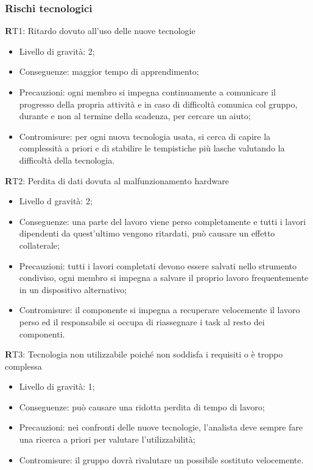 \subsubsection{Rischi tecnologici}
\textbf RT1:
 Ritardo dovuto all'uso delle nuove tecnologie
\begin{itemize}
\item Livello di gravità: 2;
\item Conseguenze: maggior tempo di apprendimento;
\item Precauzioni: ogni membro si impegna continuamente a comunicare il progresso della propria attività e in caso di difficoltà comunica col gruppo, durante e non al termine della scadenza, per cercare un aiuto;
\item Contromisure: per ogni nuova tecnologia usata, si cerca di capire la complessità a priori e di stabilire le tempistiche più lasche valutando la difficoltà della tecnologia.
\end{itemize}

\textbf RT2: 
Perdita di dati dovuta al malfunzionamento hardware
\begin{itemize}
\item Livello d gravità: 2;
\item Conseguenze: una parte del lavoro viene perso completamente e tutti i lavori dipendenti da quest'ultimo vengono ritardati, può causare un effetto collaterale;
\item Precauzioni: tutti i lavori completati devono essere salvati nello strumento condiviso, ogni membro si impegna a salvare il proprio lavoro frequentemente in un dispositivo alternativo;
\item Contromisure: il componente si impegna a recuperare velocemente il lavoro perso ed il responsabile si occupa di riassegnare i task al resto dei componenti.
\end{itemize}

\textbf RT3: 
Tecnologia non utilizzabile poiché non soddisfa i requisiti o è troppo complessa
\begin{itemize}
\item Livello di gravità: 1;
\item Conseguenze: può causare una ridotta perdita di tempo di lavoro;
\item Precauzioni: nei confronti delle nuove tecnologie, l'analista deve sempre fare una ricerca a priori per valutare l'utilizzabilità;
\item Contromisure: il gruppo dovrà rivalutare un possibile sostituto velocemente.
\end{itemize}

